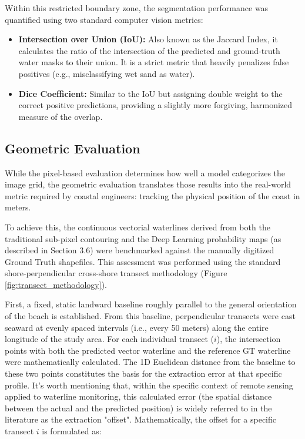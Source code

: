 ﻿\documentclass[ENG]{TFUOC}%
\begin{document}
Within this restricted boundary zone, the segmentation performance was quantified using two standard computer vision metrics:
\begin{itemize}
    \item \textbf{Intersection over Union (IoU):} Also known as the Jaccard Index, it calculates the ratio of the intersection of the predicted and ground-truth water masks to their union. It is a strict metric that heavily penalizes false positives (e.g., misclassifying wet sand as water).
    \item \textbf{Dice Coefficient:} Similar to the IoU but assigning double weight to the correct positive predictions, providing a slightly more forgiving, harmonized measure of the overlap.
\end{itemize}

\subsection{Geometric Evaluation}

While the pixel-based evaluation determines how well a model categorizes the image grid, the geometric evaluation translates those results into the real-world metric required by coastal engineers: tracking the physical position of the coast in meters. 

To achieve this, the continuous vectorial waterlines derived from both the traditional sub-pixel contouring and the Deep Learning probability maps (as described in Section 3.6) were benchmarked against the manually digitized Ground Truth shapefiles. This assessment was performed using the standard shore-perpendicular cross-shore transect methodology (Figure \ref{fig:transect_methodology}).

First, a fixed, static landward baseline roughly parallel to the general orientation of the beach is established. From this baseline, perpendicular transects were cast seaward at evenly spaced intervals (i.e., every 50 meters) along the entire longitude of the study area. For each individual transect ($i$), the intersection points with both the predicted vector waterline and the reference GT waterline were mathematically calculated. The 1D Euclidean distance from the baseline to these two points constitutes the basis for the extraction error at that specific profile. It's worth mentioning that, within the specific context of remote sensing applied to waterline monitoring, this calculated error (the spatial distance between the actual and the predicted position) is widely referred to in the literature as the extraction "offset". Mathematically, the offset for a specific transect $i$ is formulated as:
\end{document}
